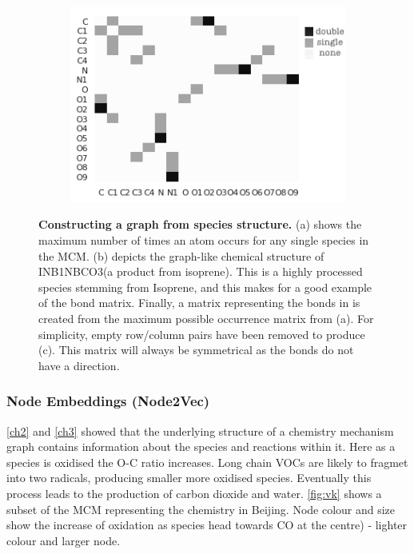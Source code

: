 \begin{figure}[H]
\begin{subfigure}[b]{0.325\textwidth}
         \includegraphics[width=\textwidth,height=.8\textwidth]{4fig/INB1NBCO3_adj.png}
          \caption{}
         \label{fig:adjmol}
     \end{subfigure}

        \caption{ \textbf{Constructing a graph from species structure.}
        (a) shows the maximum number of times an atom occurs for any single species in the MCM. (b) depicts the graph-like chemical structure of {INB1NBCO3}(a product from isoprene). This is a highly processed species stemming from Isoprene, and this makes for a good example of the bond matrix. Finally, a matrix representing the bonds in  is created from the maximum possible occurrence matrix from (a). For simplicity, empty row/column pairs have been removed to produce (c). This matrix will always be symmetrical as the bonds do not have a direction.}
        \label{fig:bondmat}
\end{figure}


\subsubsection{Node Embeddings (Node2Vec)}\label{sec:n2vec}
\autoref{ch2} and \autoref{ch3} showed that the underlying structure of a chemistry mechanism graph contains information about the species and reactions within it.  Here as a species is oxidised the O-C ratio increases. Long chain VOCs are likely to fragmet into two radicals, producing smaller more oxidised species. Eventually this process leads to the production of carbon dioxide and water. \autoref{fig:vk} shows a subset of the MCM representing the chemistry in Beijing. Node colour and size show the increase of oxidation as species head towards CO at the centre) - lighter colour and larger node.


